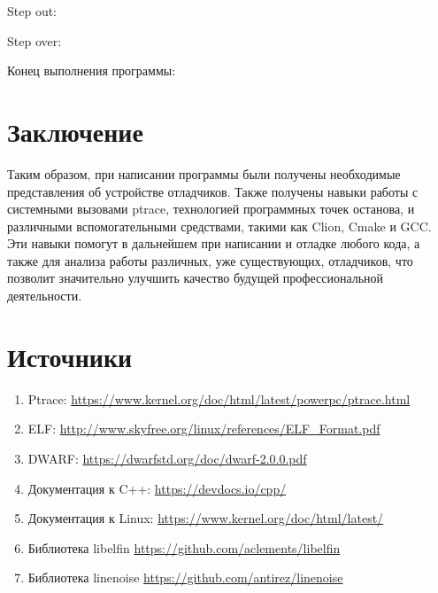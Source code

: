 \documentclass[a4paper,14pt,oneside]{extreport}  %
\begin{document}
\newpage 

\noindent Step out:
\begin{figure}[h!]
	\caption{}
\end{figure}

\noindent Step over: 
\begin{figure}[h!]
	\caption{}
\end{figure}

\newpage 

\noindent Конец выполнения программы: 
\begin{figure}[h!]
	\caption{}
\end{figure}

\chapter*{Заключение}
Таким образом, при написании программы были получены необходимые представления об устройстве отладчиков. Также получены навыки работы с системными вызовами ptrace, технологией программных точек останова, и различными вспомогательными средствами, такими как Clion, Cmake и GCC. Эти навыки помогут в дальнейшем при написании и отладке любого кода, а также для анализа работы различных, уже существующих, отладчиков, что позволит значительно улучшить качество будущей профессиональной деятельности.

\chapter*{Источники}
\begin{enumerate}
	\item Ptrace: \url{ https://www.kernel.org/doc/html/latest/powerpc/ptrace.html}
	\item ELF: \url{ http://www.skyfree.org/linux/references/ELF_Format.pdf}
	\item DWARF: \url{ https://dwarfstd.org/doc/dwarf-2.0.0.pdf}
	\item Документация к C++:  \url{https://devdocs.io/cpp/}
	\item Документация к Linux: \url{ https://www.kernel.org/doc/html/latest/}
	\item Библиотека libelfin \url {https://github.com/aclements/libelfin}
	\item Библиотека linenoise \url {https://github.com/antirez/linenoise}
\end{enumerate}
\end{document}
